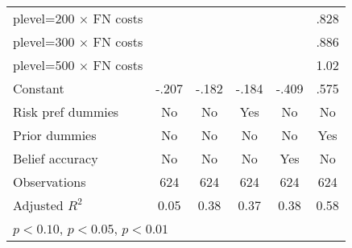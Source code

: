 {\begin{tabular}{l*{5}{c}}
plevel=200 $\times$ FN costs&                  &                  &                  &                  &     .828\sym{***}\\
plevel=300 $\times$ FN costs&                  &                  &                  &                  &     .886\sym{***}\\
plevel=500 $\times$ FN costs&                  &                  &                  &                  &     1.02\sym{***}\\
Constant        &    -.207         &    -.182\sym{**} &    -.184\sym{**} &    -.409\sym{***}&     .575\sym{***}\\
Risk pref dummies &       No         &       No         &      Yes         &       No         &       No         \\
Prior dummies   &       No         &       No         &       No         &       No         &      Yes         \\
Belief accuracy &       No         &       No         &       No         &      Yes         &       No         \\
\hline
Observations    &      624         &      624         &      624         &      624         &      624         \\
Adjusted \(R^{2}\)&     0.05         &     0.38         &     0.37         &     0.38         &     0.58         \\
\hline\hline
\multicolumn{6}{l}{\footnotesize \sym{*} \(p<0.10\), \sym{**} \(p<0.05\), \sym{***} \(p<0.01\)}\\
\end{tabular}
}
